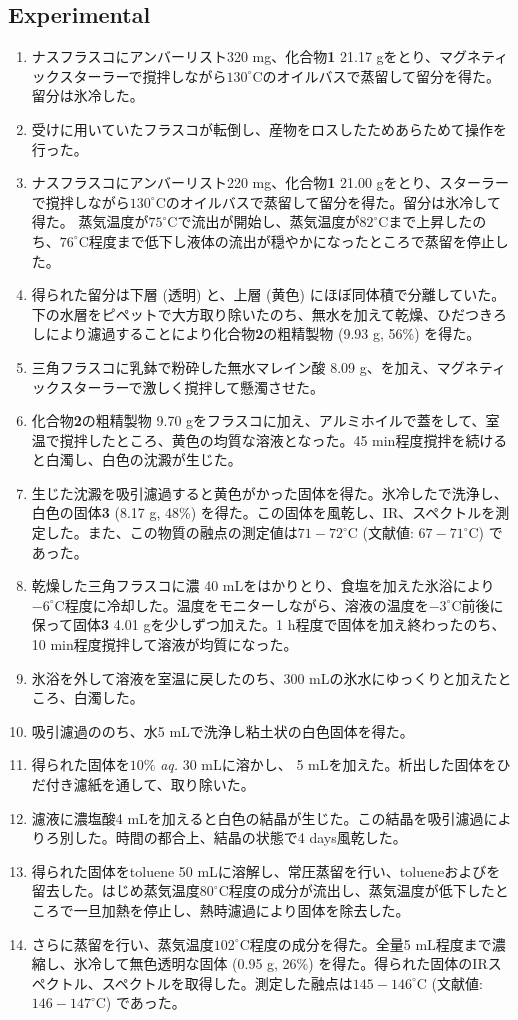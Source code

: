 \documentclass{ltjsarticle}
\theoremstyle{definition}
\numberwithin{equation}{section}
\newcommand{\D}{^\circ\text{C}}
\begin{document}
\subsection{Experimental}
\begin{enumerate}
\item ナスフラスコにアンバーリスト320 mg、化合物\textbf{1} 21.17 gをとり、マグネティックスターラーで撹拌しながら$130\D$のオイルバスで蒸留して留分を得た。留分は氷冷した。
\item 受けに用いていたフラスコが転倒し、産物をロスしたためあらためて操作を行った。
\item ナスフラスコにアンバーリスト220 mg、化合物\textbf{1} 21.00 gをとり、スターラーで撹拌しながら$130\D$のオイルバスで蒸留して留分を得た。留分は氷冷して得た。
蒸気温度が$75\D$で流出が開始し、蒸気温度が$82\D$まで上昇したのち、$76\D$程度まで低下し液体の流出が穏やかになったところで蒸留を停止した。
\item 得られた留分は下層 (透明) と、上層 (黄色) にほぼ同体積で分離していた。下の水層をピペットで大方取り除いたのち、無水を加えて乾燥、ひだつきろしにより濾過することにより化合物\textbf{2}の粗精製物 (9.93 g, 56\%) を得た。
\item 三角フラスコに乳鉢で粉砕した無水マレイン酸 8.09 g、を加え、マグネティックスターラーで激しく撹拌して懸濁させた。
\item 化合物\textbf{2}の粗精製物 9.70 gをフラスコに加え、アルミホイルで蓋をして、室温で撹拌したところ、黄色の均質な溶液となった。45 min程度撹拌を続けると白濁し、白色の沈澱が生じた。
\item 生じた沈澱を吸引濾過すると黄色がかった固体を得た。氷冷したで洗浄し、白色の固体\textbf{3} (8.17 g, 48\%) を得た。この固体を風乾し、IR、スペクトルを測定した。また、この物質の融点の測定値は$71-72\D$ (文献値: $67-71\D$) であった。
\item 乾燥した三角フラスコに濃 40 mLをはかりとり、食塩を加えた氷浴により$-6\D$程度に冷却した。温度をモニターしながら、溶液の温度を$-3\D$前後に保って固体\textbf{3} 4.01 gを少しずつ加えた。1 h程度で固体を加え終わったのち、10 min程度撹拌して溶液が均質になった。
\item 氷浴を外して溶液を室温に戻したのち、300 mLの氷水にゆっくりと加えたところ、白濁した。
\item 吸引濾過ののち、水5 mLで洗浄し粘土状の白色固体を得た。
\item 得られた固体を$10\%$ \textit{aq.} 30 mLに溶かし、 5 mLを加えた。析出した固体をひだ付き濾紙を通して、取り除いた。
\item 濾液に濃塩酸4 mLを加えると白色の結晶が生じた。この結晶を吸引濾過によりろ別した。時間の都合上、結晶の状態で4 days風乾した。
\item 得られた固体をtoluene 50 mLに溶解し、常圧蒸留を行い、tolueneおよびを留去した。はじめ蒸気温度$80\D$程度の成分が流出し、蒸気温度が低下したところで一旦加熱を停止し、熱時濾過により固体を除去した。
\item さらに蒸留を行い、蒸気温度$102\D$程度の成分を得た。全量5 mL程度まで濃縮し、氷冷して無色透明な固体 (0.95 g, 26\%) を得た。得られた固体のIRスペクトル、スペクトルを取得した。測定した融点は$145-146\D$ (文献値: $146-147\D$) であった。
\end{enumerate}
\end{document}
